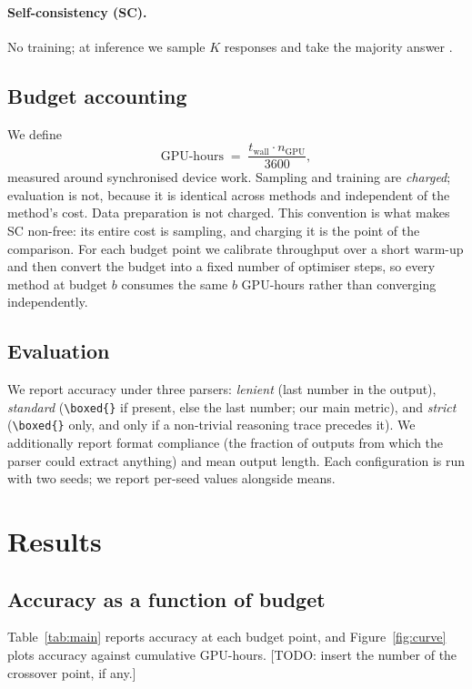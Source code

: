 \documentclass[11pt]{article}
\providecommand{\textcolor}[1]{}
\newcommand{\TODO}[1]{\textcolor{red}{[TODO: #1]}}
\begin{document}
\paragraph{Self-consistency (SC).} No training; at inference we sample $K$
responses and take the majority answer \cite{wang2022selfconsistency}.

\subsection{Budget accounting}
\label{sec:budget}
We define
\begin{equation}
  \text{GPU-hours} \;=\; \frac{t_{\text{wall}} \cdot n_{\text{GPU}}}{3600},
\end{equation}
measured around synchronised device work. Sampling and training are
\emph{charged}; evaluation is not, because it is identical across methods and
independent of the method's cost. Data preparation is not charged. This
convention is what makes SC non-free: its entire cost is sampling, and charging
it is the point of the comparison. For each budget point we calibrate
throughput over a short warm-up and then convert the budget into a fixed number
of optimiser steps, so every method at budget $b$ consumes the same $b$
GPU-hours rather than converging independently.

\subsection{Evaluation}
We report accuracy under three parsers: \emph{lenient} (last number in the
output), \emph{standard} (\texttt{\textbackslash boxed\{\}} if present, else
the last number; our main metric), and \emph{strict}
(\texttt{\textbackslash boxed\{\}} only, and only if a non-trivial reasoning
trace precedes it). We additionally report format compliance (the fraction of
outputs from which the parser could extract anything) and mean output length.
Each configuration is run with two seeds; we report per-seed values alongside
means.

\section{Results}

\subsection{Accuracy as a function of budget}
Table~\ref{tab:main} reports accuracy at each budget point, and
Figure~\ref{fig:curve} plots accuracy against cumulative GPU-hours.
\TODO{insert the number of the crossover point, if any.}
\end{document}
